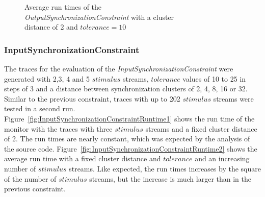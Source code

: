 \begin{figure}
\begin{minipage}{0.45\textwidth}
		\centering
		\caption{Average run times of the\\ \textit{OutputSynchronizationConstraint} with a cluster\\ distance of 2 and $tolerance=10$}
		\label{fig:OutputSynchronizationConstraintRuntime2}
	\end{minipage}\hfill
\end{figure}


\subsubsection{InputSynchronizationConstraint}
The traces for the evaluation of the \textit{InputSynchronizationConstraint} were generated with 2,3, 4 and 5 $stimulus$ streams, $tolerance$ values of 10 to 25 in steps of 3 and a distance between synchronization clusters of 2, 4, 8, 16 or 32. Similar to the previous constraint, traces with up to 202 $stimulus$ streams were tested in a second run.\\
Figure~\ref{fig:InputSynchronizationConstraintRuntime1} shows the run time of the monitor with the traces with three $stimulus$ streams and a fixed cluster distance of 2. The run times are nearly constant, which was expected by the analysis of the source code. Figure~\ref{fig:InputSynchronizationConstraintRuntime2} shows the average run time with a fixed cluster distance and $tolerance$ and an increasing number of $stimulus$ streams. Like expected, the run times increases by the square of the number of $stimulus$ streams, but the increase is much larger than in the previous constraint.

